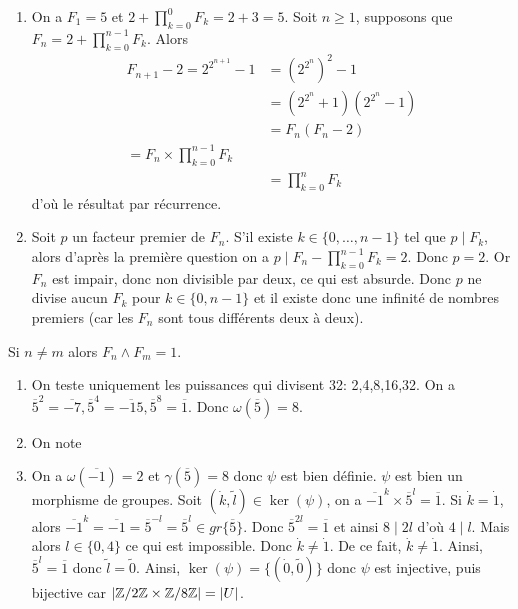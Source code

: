 \begin{solution}
	\phantom{}
	\begin{enumerate}
		\item On a $F_{1}=5$ et $2+\prod_{k=0}^{0}F_{k}=2+3=5$. Soit $n\geqslant1$, supposons que $F_{n}=2+\prod_{k=0}^{n-1}F_{k}$. Alors 
		\begin{align*}
			F_{n+1}-2=2^{2^{n+1}}-1
			&=(2^{2^{n}})^{2}-1\\
			&=(2^{2^{n}}+1)(2^{2^{n}}-1)\\
			&=F_{n}(F_{n}-2)\\
			=F_{n}\times\prod_{k=0}^{n-1}F_{k}\\
			&=\prod_{k=0}^{n}F_{k}
		\end{align*}
		d'où le résultat par récurrence.

		\item Soit $p$ un facteur premier de $F_{n}$. S'il existe $k\in\{0,\dots,n-1\}$ tel que $p\mid F_{k}$, alors d'après la première question on a $p\mid F_{n}-\prod_{k=0}^{n-1}F_{k}=2$. Donc $p=2$. Or $F_{n}$ est impair, donc non divisible par deux, ce qui est absurde. Donc $p$ ne divise aucun $F_{k}$ pour $k\in\{0,n-1\}$ et il existe donc une infinité de nombres premiers (car les $F_{n}$ sont tous différents deux à deux).
	\end{enumerate}
\end{solution}

\begin{remark}
	Si $n\neq m$ alors $F_{n}\wedge F_{m}=1$.
\end{remark}

\begin{solution}
	\phantom{}
	\begin{enumerate}
		\item On teste uniquement les puissances qui divisent 32: 2,4,8,16,32. On a $\overline{5}^{2}=\overline{-7},\overline{5}^{4}=\overline{-15},\overline{5}^{8}=\overline{1}$. Donc $\omega(\overline{5})=8$.
		\item On note 
		\item On a $\omega(\overline{-1})=2$ et $\gamma(\overline{5})=8$ donc $\psi$ est bien définie. $\psi$ est bien un morphisme de groupes. Soit $(\dot{k},\tilde{l})\in\ker(\psi)$, on a $\overline{-1}^{k}\times \overline{5}^{l}=\overline{1}$. Si $\dot{k}=\dot{1}$, alors $\overline{-1}^{k}=\overline{-1}=\overline{5}^{-l}=\overline{5}^{l}\in gr\{\overline{5}\}$. Donc $\overline{5}^{2l}=\overline{1}$ et ainsi $8\mid 2l$ d'où $4\mid l$. Mais alors $l\in\{0,4\}$ ce qui est impossible. Donc $\dot{k}\neq\dot{1}$. De ce fait, $\dot{k}\neq\dot{1}$. Ainsi, $\overline{5}^{l}=\overline{1}$ donc $\tilde{l}=\tilde{0}$. Ainsi, $\ker(\psi)=\{(\dot{0},\tilde{0})\}$ donc $\psi$ est injective, puis bijective car $\vert\mathbb{Z}/2\mathbb{Z}\times\mathbb{Z}/8\mathbb{Z}\vert=\vert U\vert$.
	\end{enumerate}
\end{solution}

